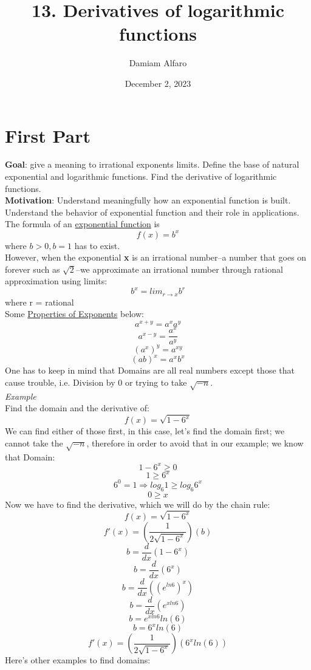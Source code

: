 \documentclass[12pt, letterpaper]{article}
\title{13. Derivatives of logarithmic functions}
\author{Damiam Alfaro}
\date{December 2, 2023} %
\begin{document}
\maketitle
\section{First Part}
\textbf{Goal}: give a meaning to irrational exponents limits. Define the base of natural exponential and logarithmic functions. Find the derivative of logarithmic functions.\\
\newline
\textbf{Motivation}: Understand meaningfully how an exponential function is built. Understand the behavior of exponential function and their role in applications.\\
\newline
The formula of an \underline{exponential function} is
\[f(x) = b^x \] where \(b > 0, b = 1\) has to exist.\\
\newline
However, when the exponential \textbf{x} is an irrational number--a number that goes on forever such as \(\sqrt{2}\)--we approximate an irrational number through rational approximation using limits:
\[b^x = lim_{r \to x} b^r\] where r = rational\\
\newline
Some \underline{Properties of Exponents} below:
\[a^{x+y} = a^xa^y\]
\[a^{x-y} = \frac{a^x}{a^y}\]
\[(a^{x})^{y} = a^{xy}\]
\[(ab)^{x} = a^{x}b^{x}\]
\newline
One has to keep in mind that Domains are all real numbers except those that cause trouble, i.e. Division by 0 or trying to take \(\sqrt{-n}\). \\
\newline
\textit{Example}\\
Find the domain and the derivative of:
\[f(x) = \sqrt{1-6^{x}}\]
We can find either of those first, in this case, let's find the domain first; we cannot take the \(\sqrt{-n}\), therefore in order to avoid that in our example; we know that Domain:
\[1-6^x \geq 0\]
\[1 \geq 6^x\]
\[6^0=1 \Rightarrow log_{6} 1 \geq log_{6} 6^x\]
\[0 \geq x\]
Now we have to find the derivative, which we will do by the chain rule:
\[f(x) = \sqrt{1-6^{x}}\]
\[f'(x) = (\frac{1}{2\sqrt{1-6^{x}}})(b)\]
\[b = \frac{d}{dx}(1-6^{x})\]
\[b = \frac{d}{dx}(6^x)\]
\[b = \frac{d}{dx}((e^{ln6})^x)\]
\[b = \frac{d}{dx}(e^{xln6})\]
\[b = e^{xln6}ln(6)\]
\[b = 6^{x}ln(6)\]
\[f'(x) = (\frac{1}{2\sqrt{1-6^{x}}})(6^{x}ln(6))\]
Here's other examples to find domains:
\end{document}
